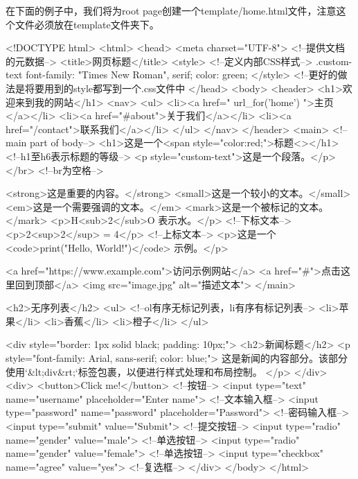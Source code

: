       在下面的例子中，我们将为root page创建一个template/home.html文件，注意这个文件必须放在template文件夹下。
      \begin{codeblock}[language=HTMLwithJinja, caption={template/home.html}]
        <!DOCTYPE html>
        <html>
        <head>
            <meta charset="UTF-8"> <!--提供文档的元数据-->
            <title>网页标题</title>
            <style> <!--定义内部CSS样式-->
                .custom-text {
                    font-family: "Times New Roman", serif;
                    color: green;
                }
            </style> <!--更好的做法是将要用到的style都写到一个.css文件中
        </head>
        <body>
            <header>
                <h1>欢迎来到我的网站</h1>
                <nav>
                    <ul>
                        <li><a href="{{ url_for('home') }}">主页</a></li>
                        <li><a href="#about">关于我们</a></li>
                        <li><a href="/contact">联系我们</a></li>
                    </ul>
                </nav>
            </header>
            <main> <!--main part of body-->
                <h1>这是一个<span style="color:red;">标题<\span></h1> <!--h1至h6表示标题的等级-->
                <p style="custom-text">这是一个段落。</p></br> <!--br为空格-->

                <strong>这是重要的内容。</strong>
                <small>这是一个较小的文本。</small>
                <em>这是一个需要强调的文本。</em>
                <mark>这是一个被标记的文本。</mark>
                <p>H<sub>2</sub>O 表示水。</p> <!--下标文本-->
                <p>2<sup>2</sup> = 4</p> <!--上标文本-->
                <p>这是一个 <code>print("Hello, World!")</code> 示例。</p>

                <a href="https://www.example.com">访问示例网站</a>
                <a href="#">点击这里回到顶部</a>
                <img src="image.jpg" alt="描述文本">
            </main>

            <h2>无序列表</h2>
            <ul> <!--ol有序无标记列表，li有序有标记列表-->
                <li>苹果</li>
                <li>香蕉</li>
                <li>橙子</li>
            </ul>

            <div style="border: 1px solid black; padding: 10px;">
                <h2>新闻标题</h2>
                <p style="font-family: Arial, sans-serif; color: blue;">
                    这是新闻的内容部分。该部分使用`&lt;div&rt;`标签包裹，以便进行样式处理和布局控制。
                </p>
            </div>
            <div>
                <button>Click me!</button> <!--按钮-->
                <input type="text" name="username" placeholder="Enter name"> <!--文本输入框-->
                <input type="password" name="password" placeholder="Password"> <!--密码输入框-->
                <input type="submit" value="Submit"> <!--提交按钮-->
                <input type="radio" name="gender" value="male"> <!--单选按钮-->
                <input type="radio" name="gender" value="female"> <!--单选按钮-->
                <input type="checkbox" name="agree" value="yes"> <!--复选框-->
            </div> 
        </body>
        </html>
      \end{codeblock}

